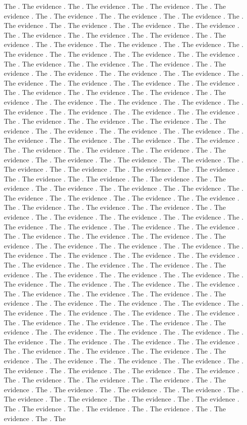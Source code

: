 {{{{The . The evidence . The . The evidence . The . The evidence . The . The evidence . The . The evidence . The . The evidence . The . The evidence . The . The evidence . The . The evidence . The . The evidence . The . The evidence . The . The evidence . The . The evidence . The . The evidence . The . The evidence . The . The evidence . The . The evidence . The . The evidence . The . The evidence . The . The evidence . The . The evidence . The . The evidence . The . The evidence . The . The evidence . The . The evidence . The . The evidence . The . The evidence . The . The evidence . The . The evidence . The . The evidence . The . The evidence . The . The evidence . The . The evidence . The . The evidence . The . The evidence . The . The evidence . The . The evidence . The . The evidence . The . The evidence . The . The evidence . The . The evidence . The . The evidence . The . The evidence . The . The evidence . The . The evidence . The . The evidence . The . The evidence . The . The evidence . The . The evidence . The . The evidence . The . The evidence . The . The evidence . The . The evidence . The . The evidence . The . The evidence . The . The evidence . The . The evidence . The . The evidence . The . The evidence . The . The evidence . The . The evidence . The . The evidence . The . The evidence . The . The evidence . The . The evidence . The . The evidence . The . The evidence . The . The evidence . The . The evidence . The . The evidence . The . The evidence . The . The evidence . The . The evidence . The . The evidence . The . The evidence . The . The evidence . The . The evidence . The . The evidence . The . The evidence . The . The evidence . The . The evidence . The . The evidence . The . The evidence . The . The evidence . The . The evidence . The . The evidence . The . The evidence . The . The evidence . The . The evidence . The . The evidence . The . The evidence . The . The evidence . The . The evidence . The . The evidence . The . The evidence . The . The evidence . The . The evidence . The . The evidence . The . The evidence . The . The evidence . The . The evidence . The . The evidence . The . The evidence . The . The evidence . The . The evidence . The . The evidence . The . The evidence . The . The evidence . The . The evidence . The . The evidence . The . The evidence . The . The evidence . The . The evidence . The . The evidence . The . The evidence . The . The evidence . The . The evidence . The . The evidence . The . The evidence . The . The evidence . The . The evidence . The . The evidence . The . The evidence . The . The evidence . The . The evidence . The . The evidence . The . The evidence . The . The evidence . The . The evidence . The . The evidence . The . The evidence . The . The evidence . The . The evidence . The . The evidence . The . The evidence . The . The evidence . The . The evidence . The . The evidence . The . The evidence . The . The evidence . The . The evidence . The . The evidence . The . The evidence . The . The evidence . The . The evidence . The . The evidence . The . The evidence . The . The evidence . The . The evidence . The . The evidence . The . The evidence . The . The evidence . The . The evidence . The . The evidence . The . The evidence . The . The evidence . The . The evidence . The . The evidence . The . The }}}}
